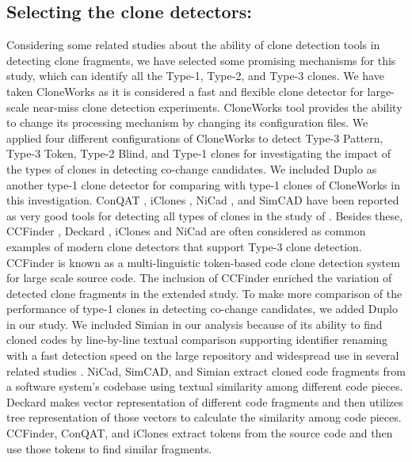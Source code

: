 \documentclass[review]{elsarticle}
\begin{document}
\subsection{Selecting the clone detectors:} Considering some related studies about the ability of clone detection tools in detecting clone fragments, we have selected some promising mechanisms for this study, which can identify all the Type-1, Type-2, and Type-3 clones. We have taken CloneWorks \cite{CloneWorks-Jeff} as it is considered a fast and flexible clone detector for large-scale near-miss clone detection experiments. CloneWorks tool provides the ability to change its processing mechanism by changing its configuration files. We applied four different configurations of CloneWorks to detect Type-3 Pattern, Type-3 Token, Type-2 Blind, and Type-1 clones for investigating the impact of the types of clones in detecting co-change candidates. We included Duplo \cite{DuploCloneDetection} as another type-1 clone detector for comparing with type-1 clones of CloneWorks in this investigation.  ConQAT \cite{conqat-clone-detecion}, iClones \cite{4812755iclones}, NiCad \cite{5970189Nicad}, and SimCAD \cite{6613857Simcad} have been reported as very good tools for detecting all types of clones in the study of \citet{jeff-evaluating}. Besides these, CCFinder \cite{CCFinderCloneDetection}, Deckard \cite{4222572Deckard}, iClones and NiCad are often considered as common examples of modern clone detectors that support Type-3 clone detection. CCFinder is known as a multi-linguistic token-based code clone detection system for large scale source code. The inclusion of CCFinder enriched the variation of detected clone fragments in the extended study.  To make more comparison of the performance of type-1 clones in detecting co-change candidates, we added Duplo in our study. We included Simian \cite{simianlink} in our analysis because of its ability to find cloned codes by line-by-line textual comparison supporting identifier renaming with a fast detection speed on the large repository and widespread use in several related studies \cite{simian-used-1, Wang-2013-SBC-2491411-2491420, impact-clone-maintenance, Cheung-clones-javascript, cloning-gnome-project}. NiCad, SimCAD, and Simian extract cloned code fragments from a software system's codebase using textual similarity among different code pieces. Deckard makes vector representation of different code fragments and then utilizes tree representation of those vectors to calculate the similarity among code pieces.  CCFinder, ConQAT, and iClones extract tokens from the source code and then use those tokens to find similar fragments.
\end{document}
